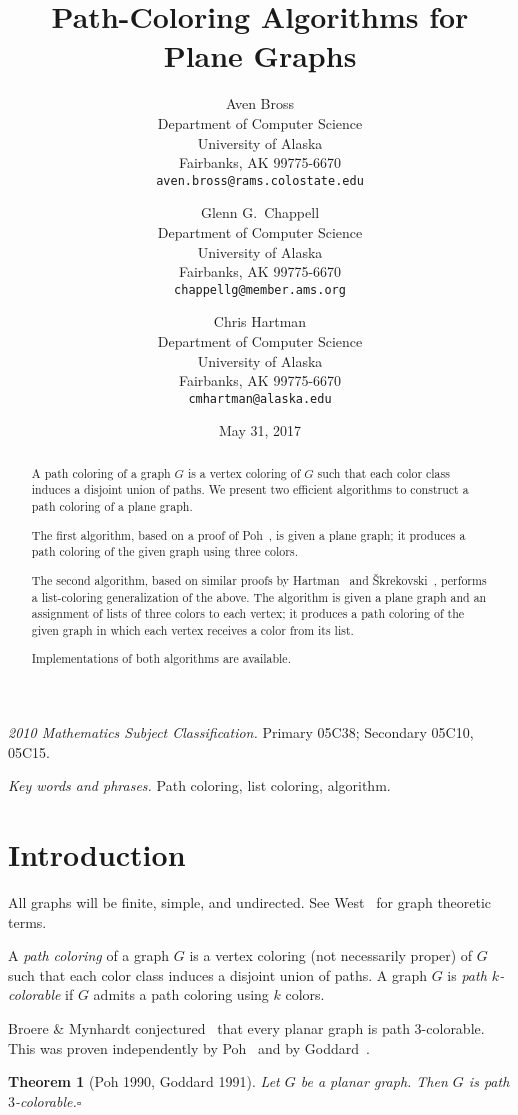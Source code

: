 \documentclass[12pt,letterpaper]{article}
\date{May 31, 2017}
\title{Path-Coloring Algorithms for Plane Graphs}
\author{Aven Bross\\
\small Department of Computer Science\\
\small University of Alaska\\
\small Fairbanks, AK 99775-6670\\
\small\texttt{aven.bross{@}rams.colostate.edu} \and
Glenn G.~Chappell\\
\small Department of Computer Science\\
\small University of Alaska\\
\small Fairbanks, AK 99775-6670\\
\small\texttt{chappellg{@}member.ams.org} \and
Chris Hartman\\
\small Department of Computer Science\\
\small University of Alaska\\
\small Fairbanks, AK 99775-6670\\
\small\texttt{cmhartman{@}alaska.edu}}
\theoremstyle{plain}
\newtheorem{theorem}[lemma]{Theorem}         %
\theoremstyle{definition}
\newcommand{\ggcqedsymbol}{$\square$}
\newcommand{\ggcqed}{\hbox{}\nobreak\hbox{\quad\ggcqedsymbol}}
\newcommand{\ggcnopf}{\ggcqed}
\newcommand{\defterm}[1]{\emph{#1}} %
\newcommand{\abstdefterm}[1]{#1} %
\begin{document}
\maketitle
\centerline{\small \textit{2010 Mathematics Subject Classification.}
 Primary 05C38; Secondary 05C10, 05C15.}
\centerline{\small \textit{Key words and phrases.}
 Path coloring, list coloring, algorithm.}

\begin{abstract}
A \abstdefterm{path coloring} of a graph $G$ is a vertex coloring
of $G$ such that each color class induces a disjoint union of paths.
We present two efficient algorithms
to construct a path coloring of a plane graph.

The first algorithm, based on a proof of Poh~\cite{Poh1990},
is given a plane graph;
it produces a path coloring of the given graph
using three colors.

The second algorithm,
based on similar proofs
by Hartman~\cite{Har1997}
and \v{S}krekovski~\cite{Skr1999},
performs a list-coloring generalization of the above.
The algorithm is given a plane graph and an assignment of lists of
three colors to each vertex;
it produces a path coloring of the given graph
in which each vertex receives a color from its list.

Implementations of both algorithms are available.
\end{abstract}


\section{Introduction}

All graphs will be finite, simple, and undirected.
See West~\cite{Wes2000} for graph theoretic terms.

A \defterm{path coloring} of a graph $G$ is a vertex coloring
(not necessarily proper) of $G$ such that each color class induces
a disjoint union of paths.
A graph $G$ is \defterm{path $k$-colorable} if $G$
admits a path coloring using $k$ colors.

Broere \& Mynhardt conjectured~\cite[Conj.~16]{BrMy1985}
that every planar graph is path $3$-colorable.
This was proven independently by Poh~\cite[Thm.~2]{Poh1990}
and by Goddard~\cite[Thm.~1]{God1991}.

\begin{theorem}[Poh 1990, Goddard 1991] \label{T:planar3c}
Let $G$ be a planar graph.
Then $G$ is path $3$-colorable.\ggcnopf\end{theorem}
\end{document}

